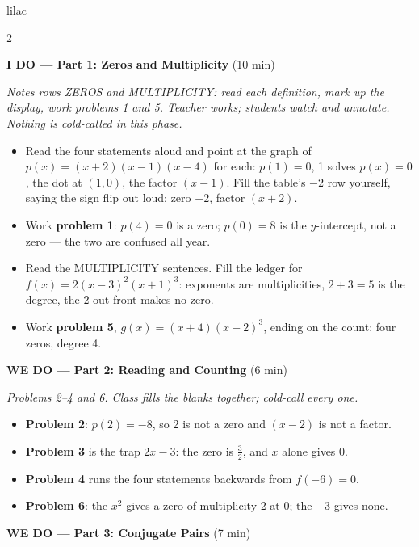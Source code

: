 \documentclass[10pt]{article}
\begin{document}
\begin{skillbox}{lilac}
\begin{multicols}{2}

\textbf{I DO --- Part 1: Zeros and Multiplicity} (10 min)

\textit{Notes rows ZEROS and MULTIPLICITY: read each definition, mark up the display, work
problems 1 and 5. Teacher works; students watch and annotate. Nothing is cold-called in this
phase.}
\begin{itemize}
  \item Read the four statements aloud and point at the graph of
        $p(x) = (x + 2)(x - 1)(x - 4)$ for each: $p(1) = 0$, 1 solves $p(x) = 0$, the dot at
        $(1, 0)$, the factor $(x - 1)$. Fill the table's $-2$ row yourself, saying the sign
        flip out loud: zero $-2$, factor $(x + 2)$.
  \item Work \textbf{problem 1}: $p(4) = 0$ is a zero; $p(0) = 8$ is the $y$-intercept, not a
        zero --- the two are confused all year.
  \item Read the MULTIPLICITY sentences. Fill the ledger for $f(x) = 2(x - 3)^2(x + 1)^3$:
        exponents are multiplicities, $2 + 3 = 5$ is the degree, the 2 out front makes no zero.
  \item Work \textbf{problem 5}, $g(x) = (x + 4)(x - 2)^3$, ending on the count: four zeros,
        degree 4.
\end{itemize}

\textbf{WE DO --- Part 2: Reading and Counting} (6 min)

\textit{Problems 2--4 and 6. Class fills the blanks together; cold-call every one.}
\begin{itemize}
  \item \textbf{Problem 2}: $p(2) = -8$, so 2 is not a zero and $(x - 2)$ is not a factor.
  \item \textbf{Problem 3} is the trap $2x - 3$: the zero is $\tfrac32$, and $x$ alone gives 0.
  \item \textbf{Problem 4} runs the four statements backwards from $f(-6) = 0$.
  \item \textbf{Problem 6}: the $x^2$ gives a zero of multiplicity 2 at 0; the $-3$ gives none.
\end{itemize}

\columnbreak

\textbf{WE DO --- Part 3: Conjugate Pairs} (7 min)


\end{multicols}
\end{skillbox}
\end{document}
